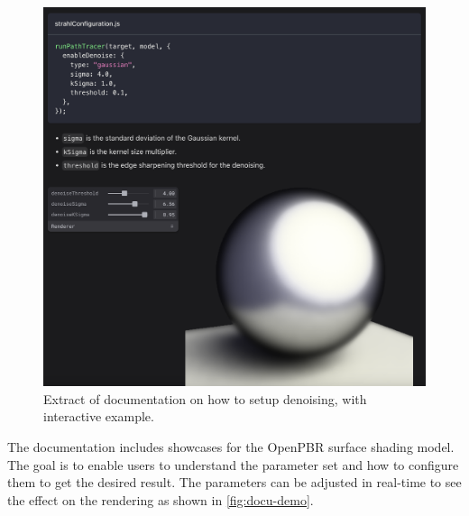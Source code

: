 \begin{figure}[H]
    \centering
    \includegraphics[width=0.7\columnwidth]{resources/website-documentation.png}
    \caption{Extract of documentation on how to setup denoising, with interactive example.}
    \label{fig:strahl-documentation}
\end{figure}

The documentation includes showcases for the \gls{OpenPBR} surface shading model. The goal is to enable users to understand the parameter set and how to configure them to get the desired result. The parameters can be adjusted in real-time to see the effect on the rendering as shown in \autoref{fig:docu-demo}.

